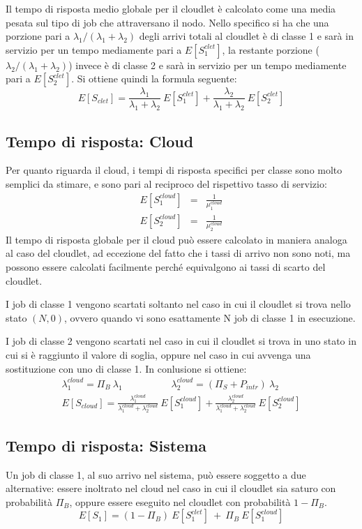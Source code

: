 Il tempo di risposta medio globale per il cloudlet è calcolato come una media
pesata sul tipo di job che attraversano il nodo. Nello specifico si ha che una
porzione pari a $\lambda_1/(\lambda_1+\lambda_2)$ degli arrivi totali al
cloudlet è di classe 1 e sarà in servizio per un tempo mediamente pari a
$E[S_1^{clet}]$, la restante porzione ($\lambda_2/(\lambda_1+\lambda_2)$) invece
è di classe 2 e sarà in servizio per un tempo mediamente pari a $E[S_2^{clet}]$.
Si ottiene quindi la formula seguente:
\begin{equation}
E[S_{clet}] = 
\frac{\lambda_1}{\lambda_1+\lambda_2} \ E[S_1^{clet}] +
\frac{\lambda_2}{\lambda_1+\lambda_2} \ E[S_2^{clet}] 
\end{equation}
%
\subsection{Tempo di risposta: Cloud}
Per quanto riguarda il cloud, i tempi di risposta specifici per classe sono
molto semplici da stimare, e sono pari al reciproco del rispettivo tasso di
servizio:
\begin{eqnarray}
E[S_1^{cloud}] &=& \frac{1}{\mu_1^{cloud}} \\
E[S_2^{cloud}] &=& \frac{1}{\mu_2^{cloud}}
\end{eqnarray}
Il tempo di risposta globale per il cloud può essere calcolato in maniera
analoga al caso del cloudlet, ad eccezione del fatto che i tassi di arrivo non
sono noti, ma possono essere calcolati facilmente perché equivalgono ai tassi di
scarto del cloudlet.

I job di classe 1 vengono scartati soltanto nel caso in cui il cloudlet si trova
nello stato $(N, 0)$, ovvero quando vi sono esattamente N job di classe 1 in
esecuzione.

I job di classe 2 vengono scartati nel caso in cui il cloudlet si trova in uno
stato in cui si è raggiunto il valore di soglia, oppure nel caso in cui avvenga
una sostituzione con uno di classe 1. In conlusione si ottiene:
\begin{eqnarray}
\lambda_1^{cloud} = \Pi_B \ \lambda_1 
\qquad\quad\qquad
\lambda_2^{cloud} = (\Pi_S + P_{intr}) \ \lambda_2 \nonumber\\[4pt]
E[S_{cloud}] = 
\frac{\lambda_1^{cloud}}{\lambda_1^{cloud}+\lambda_2^{cloud}} \ E[S_1^{cloud}] +
\frac{\lambda_2^{cloud}}{\lambda_1^{cloud}+\lambda_2^{cloud}} \ E[S_2^{cloud}] 
\end{eqnarray}
%
\subsection{Tempo di risposta: Sistema}
Un job di classe 1, al suo arrivo nel sistema, può essere soggetto a due
alternative: essere inoltrato nel cloud nel caso in cui il cloudlet sia saturo
con probabilità $\Pi_B$, oppure essere eseguito nel cloudlet con probabilità
$1-\Pi_B$.
\begin{equation}
E[S_1] = (1-\Pi_B) \ E[S_1^{clet}] \ + \ \Pi_B \ E[S_1^{cloud}]
\end{equation}

